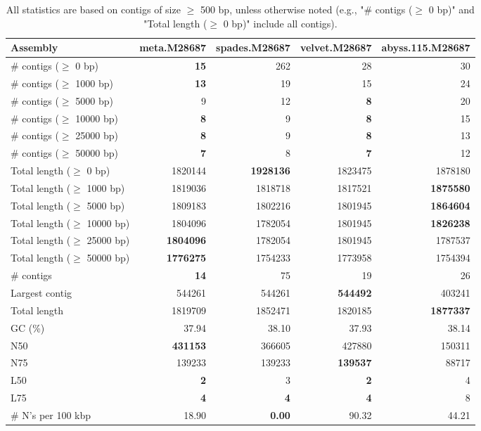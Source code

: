 \documentclass[12pt,a4paper]{article}
\begin{document}
\begin{table}[ht]
\begin{center}
\caption{All statistics are based on contigs of size $\geq$ 500 bp, unless otherwise noted (e.g., "\# contigs ($\geq$ 0 bp)" and "Total length ($\geq$ 0 bp)" include all contigs).}
\begin{tabular}{|l*{4}{|r}|}
\hline
Assembly & meta.M28687 & spades.M28687 & velvet.M28687 & abyss.115.M28687 \\ \hline
\# contigs ($\geq$ 0 bp) & {\bf 15} & 262 & 28 & 30 \\ \hline
\# contigs ($\geq$ 1000 bp) & {\bf 13} & 19 & 15 & 24 \\ \hline
\# contigs ($\geq$ 5000 bp) & 9 & 12 & {\bf 8} & 20 \\ \hline
\# contigs ($\geq$ 10000 bp) & {\bf 8} & 9 & {\bf 8} & 15 \\ \hline
\# contigs ($\geq$ 25000 bp) & {\bf 8} & 9 & {\bf 8} & 13 \\ \hline
\# contigs ($\geq$ 50000 bp) & {\bf 7} & 8 & {\bf 7} & 12 \\ \hline
Total length ($\geq$ 0 bp) & 1820144 & {\bf 1928136} & 1823475 & 1878180 \\ \hline
Total length ($\geq$ 1000 bp) & 1819036 & 1818718 & 1817521 & {\bf 1875580} \\ \hline
Total length ($\geq$ 5000 bp) & 1809183 & 1802216 & 1801945 & {\bf 1864604} \\ \hline
Total length ($\geq$ 10000 bp) & 1804096 & 1782054 & 1801945 & {\bf 1826238} \\ \hline
Total length ($\geq$ 25000 bp) & {\bf 1804096} & 1782054 & 1801945 & 1787537 \\ \hline
Total length ($\geq$ 50000 bp) & {\bf 1776275} & 1754233 & 1773958 & 1754394 \\ \hline
\# contigs & {\bf 14} & 75 & 19 & 26 \\ \hline
Largest contig & 544261 & 544261 & {\bf 544492} & 403241 \\ \hline
Total length & 1819709 & 1852471 & 1820185 & {\bf 1877337} \\ \hline
GC (\%) & 37.94 & 38.10 & 37.93 & 38.14 \\ \hline
N50 & {\bf 431153} & 366605 & 427880 & 150311 \\ \hline
N75 & 139233 & 139233 & {\bf 139537} & 88717 \\ \hline
L50 & {\bf 2} & 3 & {\bf 2} & 4 \\ \hline
L75 & {\bf 4} & {\bf 4} & {\bf 4} & 8 \\ \hline
\# N's per 100 kbp & 18.90 & {\bf 0.00} & 90.32 & 44.21 \\ \hline
\end{tabular}
\end{center}
\end{table}
\end{document}
